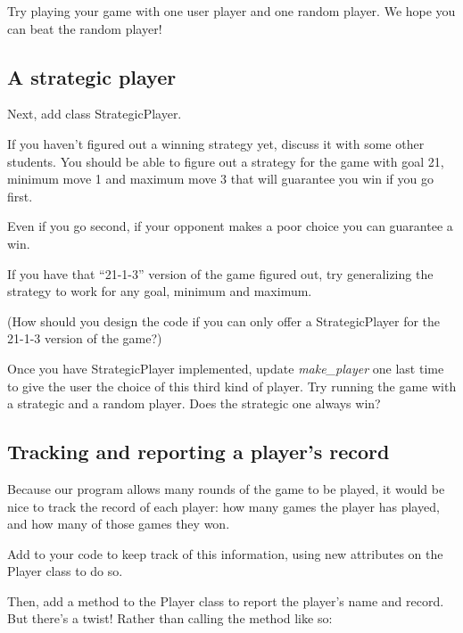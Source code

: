 \documentclass[12pt]{article}
\begin{document}
\bigskip

\noindent Try playing your game with one user player and one random player. We
hope you can beat the random player!

\bigskip

\subsection*{A strategic player}
Next, add class StrategicPlayer.

\bigskip

\noindent If you haven’t figured out a winning strategy yet, discuss it with some other students.
You should be able to figure out a strategy for the game with goal 21, minimum move 1
and maximum move 3 that will guarantee you win if you go first.

\bigskip

\noindent Even if you go second, if your opponent makes a poor choice you can guarantee a win.

\bigskip

\noindent If you have that “21-1-3” version of the game figured out, try generalizing
the strategy to work for any goal, minimum and maximum.

\bigskip

\noindent (How should you design the code if you can only offer a StrategicPlayer for the 21-1-3 version of the game?)

\bigskip

\noindent Once you have StrategicPlayer implemented, update \textit{make\_player} one last time to give the user the choice of this third kind of player. Try running the game with a strategic and a random player.
Does the strategic one always win?

\bigskip

\subsection*{Tracking and reporting a player’s record}
Because our program allows many rounds of the game to be played, it would be nice to track the record of each player: how many games the player has played, and how many of those games they won.

\noindent Add to your code to keep track of this information, using new attributes on the Player class to do so.

\bigskip

\noindent Then, add a method to the Player class to report the player’s name and record. But there’s a twist! Rather than calling the method like so:
\end{document}

